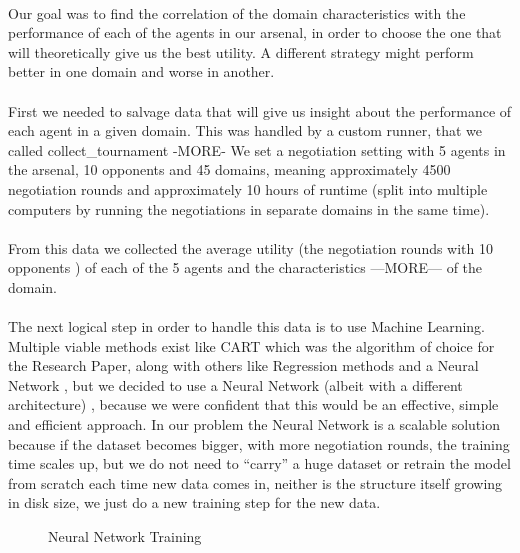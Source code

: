 \paragraph{}
Our goal was to find the correlation of the domain characteristics with the performance of each of the agents in our arsenal, in order to choose the one that will theoretically give us the best utility. 
A different strategy might perform better in one domain and worse in another.
\paragraph{}
 First we needed to salvage data that will give us insight about the performance of each agent in a given domain. 
 This was handled by a custom runner, that we called collect\_tournament -MORE- 
 We set a negotiation setting with 5 agents in the arsenal, 10 opponents and 45 domains, meaning approximately 4500 negotiation rounds and approximately
10 hours of runtime (split into multiple computers by running the negotiations in separate domains in the same time).
\paragraph{}
 From this data we collected the average utility (the negotiation rounds with 10 opponents ) of each of the 5 agents and the characteristics —MORE— of the domain.
\paragraph{}
 The next logical step in order to handle this data is to use Machine Learning. Multiple viable methods exist 
 like CART which was the algorithm of choice for the Research Paper, along with others like Regression methods and a Neural Network , 
 but we decided to use a Neural Network (albeit with a different architecture) , because we were confident that this would be an effective, simple and efficient approach. 
 In our problem the Neural Network 
 is a scalable solution because if the dataset becomes bigger, with more negotiation rounds, 
 the training time scales up, but we do not need to “carry” a huge dataset or retrain the model from scratch each time new data comes in, 
 neither is the structure itself growing in disk size, we just do a new training step for the new data.

\begin{figure}[H]
	\centering
	\captionsetup{justification=centering}
	\caption{Neural Network Training}
	\label{fig:Neural Network Training}
\end{figure}

